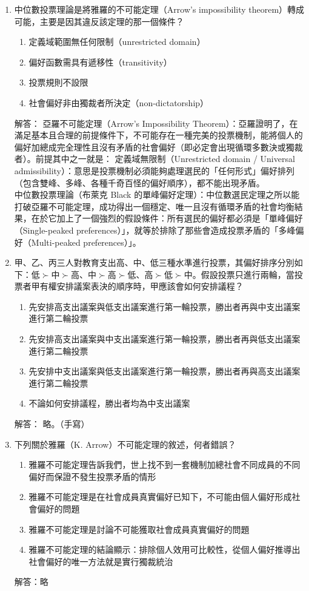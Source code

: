 \documentclass[12pt, a4paper]{article}
\begin{document}
\begin{enumerate}
    \item 中位數投票理論是將雅羅的不可能定理（Arrow's impossibility theorem）轉成可能，主要是因其違反該定理的那一個條件？
    \begin{enumerate}[label=\Alph*.]
        \item 定義域範圍無任何限制（unrestricted domain）
        \item 偏好函數需具有遞移性（transitivity）
        \item 投票規則不設限
        \item 社會偏好非由獨裁者所決定（non-dictatorship）
    \end{enumerate}
    解答：
    亞羅不可能定理（Arrow's Impossibility Theorem）：亞羅證明了，在滿足基本且合理的前提條件下，不可能存在一種完美的投票機制，能將個人的偏好加總成完全理性且沒有矛盾的社會偏好（即必定會出現循環多數決或獨裁者）。前提其中之一就是：
    定義域無限制（Unrestricted domain / Universal admissibility）：意思是投票機制必須能夠處理選民的「任何形式」偏好排列（包含雙峰、多峰、各種千奇百怪的偏好順序），都不能出現矛盾。\\
    中位數投票理論（布萊克 Black 的單峰偏好定理）：中位數選民定理之所以能打破亞羅不可能定理，成功得出一個穩定、唯一且沒有循環矛盾的社會均衡結果，在於它加上了一個強烈的假設條件：所有選民的偏好都必須是「單峰偏好（Single-peaked preferences）」，就等於排除了那些會造成投票矛盾的「多峰偏好（Multi-peaked preferences）」。

    \item 甲、乙、丙三人對教育支出高、中、低三種水準進行投票，其偏好排序分別如下：\(低 \succ 中 \succ 高\)、\(中 \succ 高 \succ 低\)、\(高 \succ 低 \succ 中\)。假設投票只進行兩輪，當投票者甲有權安排議案表決的順序時，甲應該會如何安排議程？
    \begin{enumerate}[label=\Alph*.]
        \item 先安排高支出議案與低支出議案進行第一輪投票，勝出者再與中支出議案進行第二輪投票
        \item 先安排高支出議案與中支出議案進行第一輪投票，勝出者再與低支出議案進行第二輪投票
        \item 先安排中支出議案與低支出議案進行第一輪投票，勝出者再與高支出議案進行第二輪投票
        \item 不論如何安排議程，勝出者均為中支出議案
    \end{enumerate}
    解答：
    略。（手寫）

    \item 下列關於雅羅（K. Arrow）不可能定理的敘述，何者錯誤？
    \begin{enumerate}[label=\Alph*.]
        \item 雅羅不可能定理告訴我們，世上找不到一套機制加總社會不同成員的不同偏好而保證不發生投票矛盾的情形
        \item 雅羅不可能定理是在社會成員真實偏好已知下，不可能由個人偏好形成社會偏好的問題
        \item 雅羅不可能定理是討論不可能獲取社會成員真實偏好的問題
        \item 雅羅不可能定理的結論顯示：排除個人效用可比較性，從個人偏好推導出社會偏好的唯一方法就是實行獨裁統治
    \end{enumerate}
    解答：略


\end{enumerate}
\end{document}
